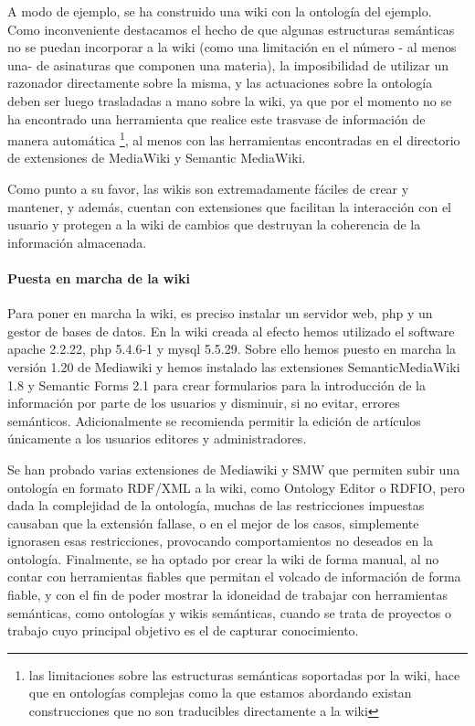 	A modo de ejemplo, se ha construido una wiki con la ontología del ejemplo. Como inconveniente destacamos el hecho de que algunas estructuras semánticas no se puedan incorporar a la wiki (como una limitación en el número - al menos una- de asinaturas que componen una materia), la imposibilidad de utilizar un razonador directamente sobre la misma, y las actuaciones sobre la ontología deben ser luego trasladadas a mano sobre la wiki, ya que por el momento no se ha encontrado una herramienta que realice este trasvase de información de manera automática \footnote{las limitaciones sobre las estructuras semánticas soportadas por la wiki, hace que en ontologías complejas como la que estamos abordando existan construcciones que no son traducibles directamente a la wiki}, al menos con las herramientas encontradas en el directorio de extensiones de MediaWiki y Semantic MediaWiki.
	
	Como punto a su favor, las wikis son extremadamente fáciles de crear y mantener, y además, cuentan con extensiones que facilitan la interacción con el usuario y protegen a la wiki de cambios que destruyan la coherencia de la información almacenada.
	
	\paragraph{Puesta en marcha de la wiki}
	Para poner en marcha la wiki, es preciso instalar un servidor web, php y un gestor de bases de datos. En la wiki creada al efecto hemos utilizado el software apache 2.2.22, php 5.4.6-1 y mysql 5.5.29. Sobre ello hemos puesto en marcha la versión 1.20 de Mediawiki y hemos instalado las extensiones SemanticMediaWiki 1.8 y Semantic Forms 2.1 para crear formularios para la introducción de la información por parte de los usuarios y disminuir, si no evitar, errores semánticos. Adicionalmente se recomienda permitir la edición de artículos únicamente a los usuarios editores y administradores.
	
	Se han probado varias extensiones de Mediawiki y SMW que permiten subir una ontología en formato RDF/XML a la wiki, como Ontology Editor o RDFIO, pero dada la complejidad de la ontología, muchas de las restricciones impuestas causaban que la extensión fallase, o en el mejor de los casos, simplemente ignorasen esas restricciones, provocando comportamientos no deseados en la ontología. Finalmente, se ha optado por crear la wiki de forma manual, al no contar con herramientas fiables que permitan el volcado de información de forma fiable, y con el fin de poder mostrar la idoneidad de trabajar con herramientas semánticas, como ontologías y wikis semánticas, cuando se trata de proyectos o trabajo cuyo principal objetivo es el de capturar conocimiento.
	




